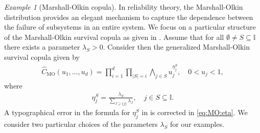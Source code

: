 \documentclass[aos]{imsart}
\numberwithin{equation}{section}
\theoremstyle{plain} %
\theoremstyle{remark}
\newtheorem{example}[theorem]{Example}
\newcommand{\MO}{\mathrm{MO}}
\begin{document}
\begin{example}[Marshall-Olkin copula]\label{ex:cop:mo}
In reliability theory, the Marshall-Olkin distribution provides an elegant mechanism to capture the dependence between the failure of subsystems in an entire system. We focus on a particular structure of the Marshall-Olkin survival copula as given in \citep[eq. (2.4), page 58]{lin:li:2014}. Assume that for all $\emptyset \neq S\subseteq \mathbb{I}$  there exists a parameter $\lambda_S>0$. Consider then the generalized Marshall-Olkin survival copula  given by
\begin{align}\label{eq:scop:mo}
   \widehat{C}_{\MO}(u_1,\ldots,u_d) = \prod_{i=1}^d \prod_{|S|=i} \bigwedge_{j\in S} u_j^{\eta_j^S}, \quad 0 < u_j <1,
\end{align}
where
\begin{align}\label{eq:MO:eta}
    \eta_j^S = \frac{\lambda_S}{\sum\limits_{J \supseteq \{j\} } \lambda_J}, \quad j\in S \subseteq \mathbb{I}.
\end{align}
A typographical error in the formula for $\eta_j^S$ in \citep[eq. (2.4), page 58]{lin:li:2014} is corrected in  \eqref{eq:MO:eta}. We consider two particular choices of the parameters $\lambda_S$ for our examples.


\end{example}
\end{document}
